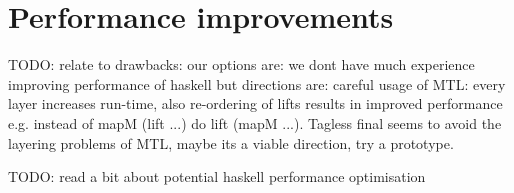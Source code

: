 	

\section{Performance improvements}
TODO: relate to drawbacks: our options are: we dont have much experience improving performance of haskell but directions are: careful usage of MTL: every layer increases run-time, also re-ordering of lifts results in improved performance e.g. instead of mapM (lift ...) do lift (mapM ...). Tagless final seems to avoid the layering problems of MTL, maybe its a viable direction, try a prototype.

TODO: read a bit about potential haskell performance optimisation

